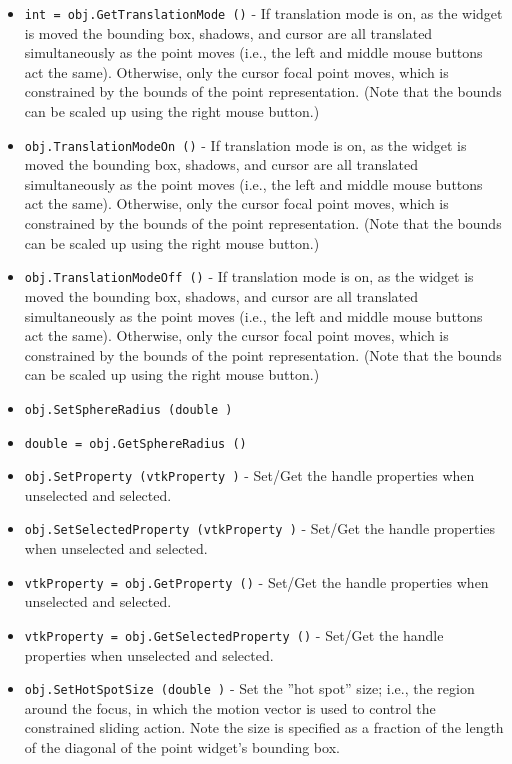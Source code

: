 \begin{itemize}
\item  \verb|int = obj.GetTranslationMode ()| -  If translation mode is on, as the widget is moved the bounding box,
 shadows, and cursor are all translated simultaneously as the point moves
 (i.e., the left and middle mouse buttons act the same).  Otherwise, only
 the cursor focal point moves, which is constrained by the bounds of the
 point representation. (Note that the bounds can be scaled up using the
 right mouse button.)

\item  \verb|obj.TranslationModeOn ()| -  If translation mode is on, as the widget is moved the bounding box,
 shadows, and cursor are all translated simultaneously as the point moves
 (i.e., the left and middle mouse buttons act the same).  Otherwise, only
 the cursor focal point moves, which is constrained by the bounds of the
 point representation. (Note that the bounds can be scaled up using the
 right mouse button.)

\item  \verb|obj.TranslationModeOff ()| -  If translation mode is on, as the widget is moved the bounding box,
 shadows, and cursor are all translated simultaneously as the point moves
 (i.e., the left and middle mouse buttons act the same).  Otherwise, only
 the cursor focal point moves, which is constrained by the bounds of the
 point representation. (Note that the bounds can be scaled up using the
 right mouse button.)

\item  \verb|obj.SetSphereRadius (double )|

\item  \verb|double = obj.GetSphereRadius ()|

\item  \verb|obj.SetProperty (vtkProperty )| -  Set/Get the handle properties when unselected and selected.

\item  \verb|obj.SetSelectedProperty (vtkProperty )| -  Set/Get the handle properties when unselected and selected.

\item  \verb|vtkProperty = obj.GetProperty ()| -  Set/Get the handle properties when unselected and selected.

\item  \verb|vtkProperty = obj.GetSelectedProperty ()| -  Set/Get the handle properties when unselected and selected.

\item  \verb|obj.SetHotSpotSize (double )| -  Set the ''hot spot'' size; i.e., the region around the focus, in which the
 motion vector is used to control the constrained sliding action. Note the
 size is specified as a fraction of the length of the diagonal of the 
 point widget's bounding box.


\end{itemize}

